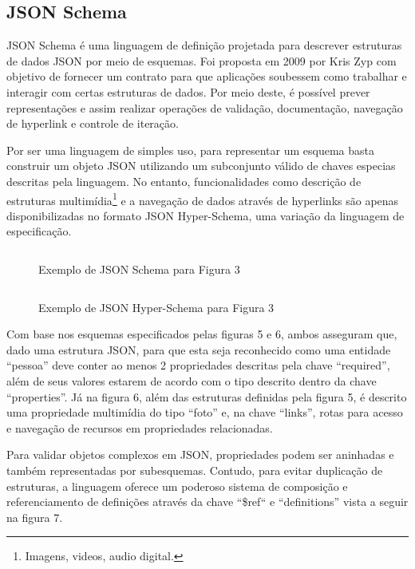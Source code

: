 \subsection[JSON Schema]{JSON Schema}

JSON Schema é uma linguagem de definição projetada para descrever estruturas de dados JSON por meio de esquemas. Foi proposta em 2009 por Kris Zyp com objetivo de fornecer um contrato para que aplicações soubessem como trabalhar e interagir com certas estruturas de dados. Por meio deste, é possível prever representações e assim realizar operações de validação, documentação, navegação de hyperlink e controle de iteração.

Por ser uma linguagem de simples uso, para representar um esquema basta construir um objeto JSON utilizando um subconjunto válido de chaves especias descritas pela linguagem. No entanto, funcionalidades como descrição de estruturas multimídia\footnote{
  Imagens, videos, audio digital.
} e a navegação de dados através de hyperlinks são apenas disponibilizadas no formato JSON Hyper-Schema, uma variação da linguagem de especificação. \cite{Jackson2016}

\begin{figure}[H]
  \centering
  \inputminted[frame=single,framesep=10pt]{javascript}{anexos/pessoa-schema.json}
  \caption{Exemplo de JSON Schema para Figura 3}
\end{figure}

\begin{figure}[H]
  \centering
  \inputminted[frame=single,framesep=10pt]{javascript}{anexos/pessoa-hyper-schema.json}
  \caption{Exemplo de JSON Hyper-Schema para Figura 3}
\end{figure}

Com base nos esquemas especificados pelas figuras 5 e 6, ambos asseguram que, dado uma estrutura JSON, para que esta seja reconhecido como uma entidade “pessoa” deve conter ao menos 2 propriedades descritas pela chave “required”, além de seus valores estarem de acordo com o tipo descrito dentro da chave “properties”. Já na figura 6, além das estruturas definidas pela figura 5, é descrito uma propriedade multimídia do tipo “foto” e, na chave “links”, rotas para acesso e navegação de recursos em propriedades relacionadas.

Para validar objetos complexos em JSON, propriedades podem ser aninhadas e também representadas por subesquemas. Contudo, para evitar duplicação de estruturas, a linguagem oferece um poderoso sistema de composição e referenciamento de definições através da chave “\$ref“ e “definitions” vista a seguir na figura 7. \cite{Droettboom2015}

